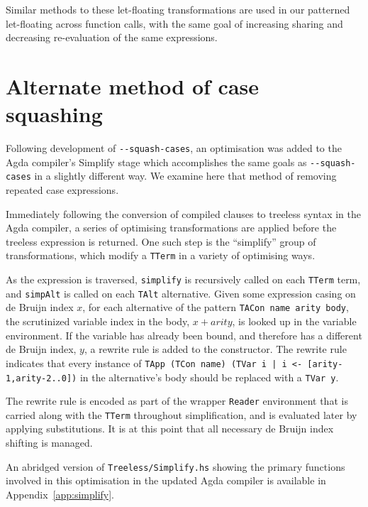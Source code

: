 Similar methods to these let-floating transformations are used in our patterned let-floating across function calls, with the same goal of increasing sharing and decreasing re-evaluation of the same expressions.

\section{Alternate method of case squashing}
\label{sub:alternate_case_squash}

Following development of \texttt{-{}-squash-cases}, an optimisation was added to the Agda compiler's Simplify stage which accomplishes the same goals as \texttt{-{}-squash-cases} in a slightly different way. We examine here that method of removing repeated case expressions.

Immediately following the conversion of compiled clauses to treeless syntax in the Agda compiler, a series of optimising transformations are applied before the treeless expression is returned. 
One such step is the ``simplify'' group of transformations, which modify a \lstinline{TTerm} in a variety of optimising ways.

As the expression is traversed, \lstinline{simplify} is recursively called on each \lstinline{TTerm} term, and \lstinline{simpAlt} is called on each \lstinline{TAlt} alternative. Given some expression casing on de Bruijn index $x$, for each alternative of the pattern \lstinline{TACon name arity body}, the scrutinized variable index in the body, $x + arity$, is looked up in the variable environment. If the variable has already been bound, and therefore has a different de Bruijn index, $y$, a rewrite rule is added to the constructor. The rewrite rule indicates that every instance of \lstinline{TApp (TCon name) (TVar i | i <- [arity-1,arity-2..0])} in the alternative's body should be replaced with a \lstinline{TVar y}.

The rewrite rule is encoded as part of the wrapper \lstinline{Reader} environment that is carried along with the \lstinline{TTerm} throughout simplification, and is evaluated later by applying substitutions. It is at this point that all necessary de Bruijn index shifting is managed.

An abridged version of \texttt{Treeless/Simplify.hs} showing the primary functions involved in this optimisation in the updated Agda compiler is available in Appendix~\ref{app:simplify}.
